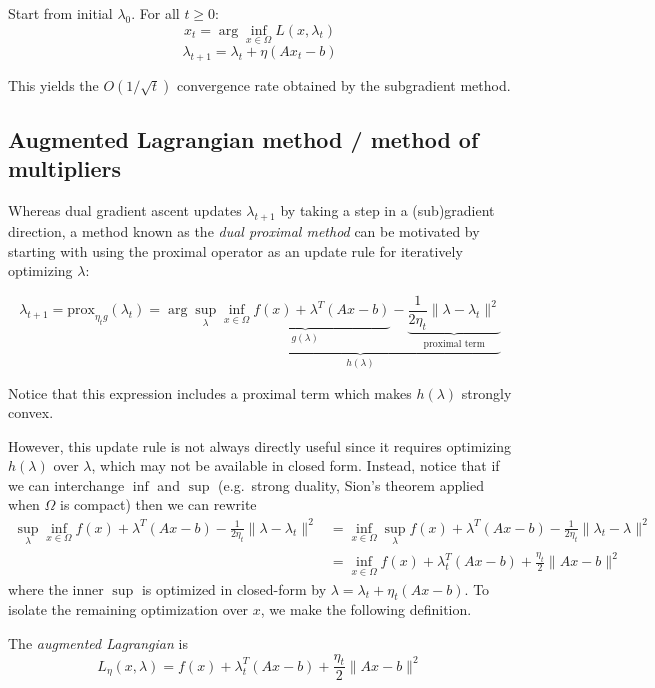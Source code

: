 Start from initial $\lambda_0$.
For all $t \geq 0$:
\[
x_t = \arg\inf_{x \in \Omega} L(x, \lambda_t)
\]
\[
\lambda_{t+1} = \lambda_t + \eta (A x_t - b)
\]

This yields the $O(1/\sqrt{t})$ convergence rate obtained by the
subgradient method.

\subsection{Augmented Lagrangian method / method of multipliers}

Whereas dual gradient ascent updates $\lambda_{t+1}$ by taking a step
in a (sub)gradient direction, a method known as the \emph{dual proximal
method} can be motivated by starting with using the proximal operator \cite{parikh2014proximal}
as an update rule for iteratively optimizing $\lambda$:

\[
\lambda_{t+1}
= \mathrm{prox}_{\eta_t g}(\lambda_t)
 = \arg\sup_{\lambda} \underbrace{\underbrace{\inf_{x \in \Omega} f(x) + \lambda^T (A x - b)}_{g(\lambda)} - \underbrace{\frac{1}{2 \eta_t} \|\lambda - \lambda_t\|^2}_{\text{proximal term}}}_{h(\lambda)}
\]

Notice that this expression includes a proximal term which makes
$h(\lambda)$ strongly convex.

However, this update rule is not always directly useful since it requires
optimizing $h(\lambda)$ over $\lambda$, which may not be available
in closed form. Instead, notice that if we can interchange $\inf$ and
$\sup$ (e.g.~strong duality, Sion's theorem applied when $\Omega$ is
compact) then we can rewrite
\begin{align*}
\sup_{\lambda} \inf_{x \in \Omega} f(x) + \lambda^T(A x - b) - \frac{1}{2 \eta_t} \|\lambda - \lambda_t\|^2 &= \inf_{x \in \Omega} \sup_\lambda f(x) + \lambda^T(A x - b) - \frac{1}{2\eta_t} \|\lambda_t - \lambda\|^2 \\
&= \inf_{x \in \Omega} f(x) + \lambda_t^T (A x - b) + \frac{\eta_t}{2}\|A x - b\|^2
\end{align*}
where the inner $\sup$ is optimized in closed-form by
$\lambda = \lambda_t + \eta_t(A x - b)$. To isolate the remaining
optimization over $x$, we make the following definition.

\begin{definition}
The \emph{augmented Lagrangian} is
\[L_\eta(x,\lambda) = f(x) + \lambda_t^T (A x - b) + \frac{\eta_t}{2}\|A x - b\|^2\]
\end{definition}

